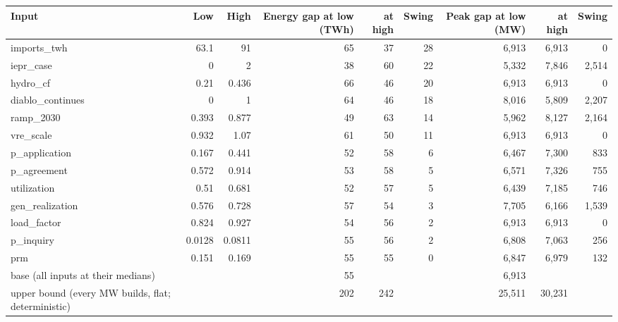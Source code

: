 \begin{tabular}{lrrrrrrrr}
\toprule
Input & Low & High & Energy gap at low (TWh) & at high & Swing & Peak gap at low (MW) & at high & Swing \\
\midrule
imports\_twh & 63.1 & 91 & 65 & 37 & 28 & 6,913 & 6,913 & 0 \\
iepr\_case & 0 & 2 & 38 & 60 & 22 & 5,332 & 7,846 & 2,514 \\
hydro\_cf & 0.21 & 0.436 & 66 & 46 & 20 & 6,913 & 6,913 & 0 \\
diablo\_continues & 0 & 1 & 64 & 46 & 18 & 8,016 & 5,809 & 2,207 \\
ramp\_2030 & 0.393 & 0.877 & 49 & 63 & 14 & 5,962 & 8,127 & 2,164 \\
vre\_scale & 0.932 & 1.07 & 61 & 50 & 11 & 6,913 & 6,913 & 0 \\
p\_application & 0.167 & 0.441 & 52 & 58 & 6 & 6,467 & 7,300 & 833 \\
p\_agreement & 0.572 & 0.914 & 53 & 58 & 5 & 6,571 & 7,326 & 755 \\
utilization & 0.51 & 0.681 & 52 & 57 & 5 & 6,439 & 7,185 & 746 \\
gen\_realization & 0.576 & 0.728 & 57 & 54 & 3 & 7,705 & 6,166 & 1,539 \\
load\_factor & 0.824 & 0.927 & 54 & 56 & 2 & 6,913 & 6,913 & 0 \\
p\_inquiry & 0.0128 & 0.0811 & 55 & 56 & 2 & 6,808 & 7,063 & 256 \\
prm & 0.151 & 0.169 & 55 & 55 & 0 & 6,847 & 6,979 & 132 \\
\midrule
base (all inputs at their medians) & & & 55 & & & 6,913 & & \\
upper bound (every MW builds, flat; deterministic) & & & 202 & 242 & & 25,511 & 30,231 & \\
\bottomrule
\end{tabular}